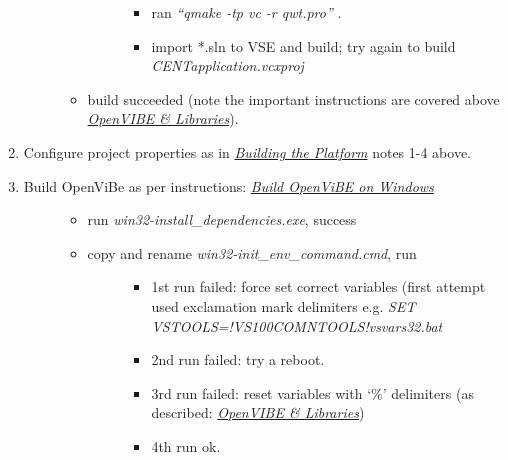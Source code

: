 \documentclass[letterpaper,10pt,english]{sphinxmanual}
\begin{document}
\begin{enumerate}
\begin{description}
\begin{itemize}
\begin{description}
\begin{itemize}
\item {} 
ran \emph{``qmake -tp vc -r qwt.pro''} .

\item {} 
import *.sln to VSE and build; try again to build \emph{CENTapplication.vcxproj}

\end{itemize}

\end{description}

\item {} 
build succeeded (note the important instructions are covered above {\hyperref[index:ov-and-libs-build]{\emph{OpenVIBE \& Libraries}}}).

\end{itemize}

\end{description}

\item {} 
Configure project properties as in {\hyperref[index:build-plat]{\emph{Building the Platform}}} notes 1-4 above.

\item {} \begin{description}
\item[{Build OpenViBe as per instructions: {\hyperref[index:build-ov]{\emph{Build OpenViBE on Windows}}}}] \leavevmode\begin{itemize}
\item {} 
run \emph{win32-install\_dependencies.exe}, success

\item {} \begin{description}
\item[{copy and rename \emph{win32-init\_env\_command.cmd}, run}] \leavevmode\begin{itemize}
\item {} 
1st run failed: force set correct variables (first attempt used exclamation mark delimiters e.g. \emph{SET VSTOOLS=!VS100COMNTOOLS!vsvars32.bat}

\item {} 
2nd run failed: try a reboot.

\item {} 
3rd run failed: reset variables with `\%' delimiters (as described: {\hyperref[index:ov-and-libs-build]{\emph{OpenVIBE \& Libraries}}})

\item {} 
4th run ok.

\end{itemize}


\end{description}
\end{itemize}
\end{description}
\end{enumerate}
\end{document}
